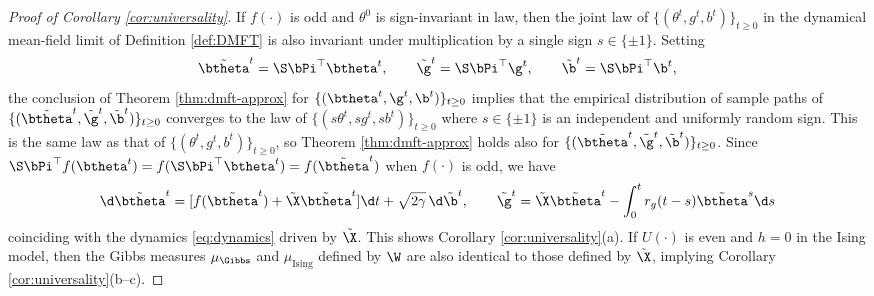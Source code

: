 \begin{proof}[Proof of Corollary \ref{cor:universality}]
If $f(\cdot)$ is odd and $\theta^0$ is sign-invariant in law, then 
the joint law of $\{(\theta^t,g^t,b^t)\}_{t \geq 0}$ in the dynamical
mean-field limit of Definition \ref{def:DMFT} is also invariant under
multiplication by a single sign $s \in \{\pm 1\}$. Setting
\[\tilde\btheta^t=\S\bPi^\top \btheta^t,
\qquad \tilde\g^t=\S\bPi^\top \g^t,
\qquad \tilde\b^t=\S\bPi^\top \b^t,\]
the conclusion of Theorem \ref{thm:dmft-approx} 
for $\{(\btheta^t,\g^t,\b^t)\}_{t \geq 0}$ implies that the empirical
distribution of sample paths of
$\{(\tilde\btheta^t,\tilde\g^t,\tilde\b^t)\}_{t \geq 0}$ converges to
the law of $\{(s\theta^t,sg^t,sb^t)\}_{t \geq 0}$ where $s \in \{\pm 1\}$ is
an independent and uniformly random sign. This is the same law as
that of $\{(\theta^t,g^t,b^t)\}_{t \geq 0}$, so Theorem \ref{thm:dmft-approx} 
holds also for $\{(\tilde\btheta^t,\tilde\g^t,\tilde\b^t)\}_{t \geq 0}$.
Since $\S\bPi^\top f(\btheta^t)=f(\S\bPi^\top\btheta^t)=f(\tilde\btheta^t)$ when
$f(\cdot)$ is odd, we have
\[\d\tilde\btheta^t=[f(\tilde\btheta^t)+\tilde\X\tilde\btheta^t]\d t
+\sqrt{2\gamma}\,\d\tilde \b^t,
\qquad \tilde \g^t=\tilde\X\tilde\btheta^t-\int_0^t
r_g(t-s)\tilde\btheta^s\d s\]
coinciding with the dynamics \eqref{eq:dynamics} driven by $\tilde\X$.
This shows
Corollary \ref{cor:universality}(a). If $U(\cdot)$ is even and $h=0$ in the
Ising model, then the Gibbs measures $\mu_\Gibbs$ and $\mu_\text{Ising}$ defined
by $\W$ are also identical to those defined by $\tilde \X$, implying
Corollary \ref{cor:universality}(b--c).
\end{proof}
